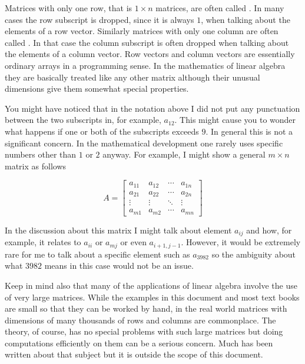 Matrices with only one row, that is $1 \times n$ matrices, are often called . In many cases the row subscript is dropped, since it is always $1$, when talking
about the elements of a row vector. Similarly matrices with only one column are often called
. In that case the column subscript is often dropped when talking about
the elements of a column vector. Row vectors and column vectors are essentially ordinary arrays
in a programming sense. In the mathematics of linear algebra they are basically treated like any
other matrix although their unusual dimensions give them somewhat special properties.

You might have noticed that in the notation above I did not put any punctuation between the two
subscripts in, for example, $a_{12}$. This might cause you to wonder what happens if one or both
of the subscripts exceeds $9$. In general this is not a significant concern. In the mathematical
development one rarely uses specific numbers other than $1$ or $2$ anyway. For example, I might
show a general $m \times n$ matrix as follows

\begin{displaymath}
A = \left[
\begin{array}{cccc}
  a_{11} & a_{12} & \cdots & a_{1n} \\
  a_{21} & a_{22} & \cdots & a_{2n} \\
  \vdots & \vdots & \ddots & \vdots \\
  a_{m1} & a_{m2} & \cdots & a_{mn}
\end{array}
    \right]
\end{displaymath}

In the discussion about this matrix I might talk about element $a_{ij}$ and how, for example, it
relates to $a_{ii}$ or $a_{mj}$ or even $a_{i+1,j-1}$. However, it would be extremely rare for
me to talk about a specific element such as $a_{3982}$ so the ambiguity about what $3982$ means
in this case would not be an issue.

Keep in mind also that many of the applications of linear algebra involve the use of very large
matrices. While the examples in this document and most text books are small so that they can be
worked by hand, in the real world matrices with dimensions of many thousands of rows and columns
are commonplace. The theory, of course, has no special problems with such large matrices but
doing computations efficiently on them can be a serious concern. Much has been written about
that subject but it is outside the scope of this document.

